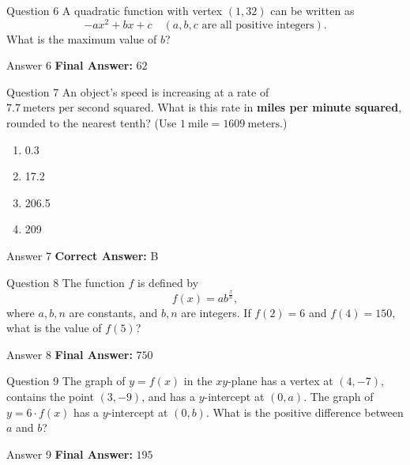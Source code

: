 \documentclass{beamer}
\begin{document}
\begin{frame}{Question 6}
\small
A quadratic function with vertex \((1, 32)\) can be written as
\[
 -ax^2 + bx + c \quad (a, b, c \text{ are all positive integers}).
\]
What is the maximum value of \(b\)?
\end{frame}
\begin{frame}{Answer 6}
\small
\textbf{Final Answer:} $\boxed{62}$
\end{frame}

\begin{frame}{Question 7}
\small
An object's speed is increasing at a rate of \(7.7\ \text{meters per second squared}\). What is this rate in \textbf{miles per minute squared}, rounded to the nearest tenth? (Use \(1\ \text{mile} = 1609\ \text{meters}\).)
\vspace{0.35cm}
\begin{enumerate}
    \item[A.] 0.3
    \item[B.] 17.2
    \item[C.] 206.5
    \item[D.] 209
\end{enumerate}
\end{frame}
\begin{frame}{Answer 7}
\small
\textbf{Correct Answer:} B
\end{frame}

\begin{frame}{Question 8}
\small
The function \(f\) is defined by
\[
f(x) = ab^{\frac{x}{n}},
\]
where \(a, b, n\) are constants, and \(b, n\) are integers. If \(f(2) = 6\) and \(f(4) = 150\), what is the value of \(f(5)\)?
\end{frame}
\begin{frame}{Answer 8}
\small
\textbf{Final Answer:} $\boxed{750}$
\end{frame}

\begin{frame}{Question 9}
\small
The graph of \(y = f(x)\) in the \(xy\)-plane has a vertex at \((4, -7)\), contains the point \((3, -9)\), and has a \(y\)-intercept at \((0, a)\). The graph of \(y = 6 \cdot f(x)\) has a \(y\)-intercept at \((0, b)\). What is the positive difference between \(a\) and \(b\)?
\end{frame}
\begin{frame}{Answer 9}
\small
\textbf{Final Answer:} $\boxed{195}$
\end{frame}
\end{document}
